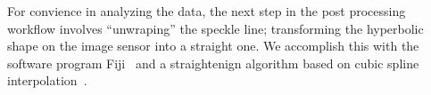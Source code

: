 For convience in analyzing the data, the next step in the post processing
workflow involves ``unwraping'' the speckle line; transforming the
hyperbolic shape on the image sensor into a straight one.  We accomplish
this with the software program Fiji~\cite{schindelin2012fiji} and a
straightenign algorithm based on cubic spline
interpolation~\cite{kocsis1991image}.

